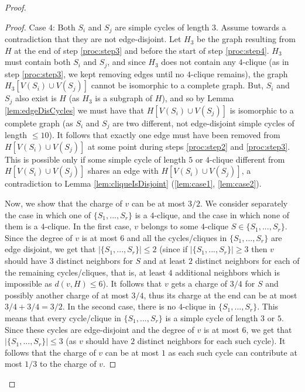 \documentclass{article}
\theoremstyle{definition}
\begin{document}
\begin{proof}
\begin{proof}
Case 4: Both $S_i$ and $S_j$ are simple cycles of length $3$. Assume towards a contradiction that they are not edge-disjoint. Let $H_3$ be the graph resulting from $H$ at the end of step \ref{proc:step3} and before the start of step \ref{proc:step4}. $H_3$ must contain both $S_i$ and $S_j$, and since $H_3$ does not contain any $4$-clique (as in step \ref{proc:step3}, we kept removing edges until no $4$-clique remains), the graph $H_3[V(S_i) \cup V(S_j)]$ cannot be isomorphic to a complete graph. But, $S_i$ and $S_j$ also exist is $H$ (as $H_3$ is a subgraph of $H$), and so by Lemma \ref{lem:edgeDisCycles} we must have that $H[V(S_i) \cup V(S_j)]$ is isomorphic to a complete graph (as $S_i$ and $S_j$ are two different, not edge-disjoint simple cycles of length $\le 10$). It follows that exactly one edge must have been removed from $H[V(S_i) \cup V(S_j)]$ at some point during steps \ref{proc:step2} and \ref{proc:step3}. This is possible only if some simple cycle of length $5$ or $4$-clique different from $H[V(S_i) \cup V(S_j)]$ shares an edge with $H[V(S_i) \cup V(S_j)]$, a contradiction to Lemma \ref{lem:cliqueIsDisjoint} (\ref{lem:case1}, \ref{lem:case2}).\smallskip

Now, we show that the charge of $v$ can be at most $3/2$. We consider separately the case in which one of $\{S_1, ..., S_r\}$ is a $4$-clique, and the case in which none of them is a $4$-clique. In the first case, $v$ belongs to some $4$-clique $S \in \{S_1, ..., S_r\}$. Since the degree of $v$ is at most $6$ and all the cycles/cliques in $\{S_1, ..., S_r\}$ are edge disjoint, we get that $|\{S_1, ..., S_r\}| \le 2$ (since if $|\{S_1, ..., S_r\}| \ge 3$ then $v$ should have $3$ distinct neighbors for $S$ and at least $2$ distinct neighbors for each of the remaining cycles/cliques, that is, at least $4$ additional neighbors which is impossible as $d(v,H) \le 6$). It follows that $v$ gets a charge of $3/4$ for $S$ and possibly another charge of at most $3/4$, thus its charge at the end can be at most $3/4 + 3/4 = 3/2$. In the second case, there is no $4$-clique in $\{S_1, ..., S_r\}$. This means that every cycle/clique in $\{S_1, ..., S_r\}$ is a simple cycle of length $3$ or $5$. Since these cycles are edge-disjoint and the degree of $v$ is at most $6$, we get that $|\{S_1, ..., S_r\}| \le 3$ (as $v$ should have $2$ distinct neighbors for each such cycle). It follows that the charge of $v$ can be at most $1$ as each such cycle can contribute at most $1/3$ to the charge of $v$.\end{proof}


\end{proof}
\end{document}
